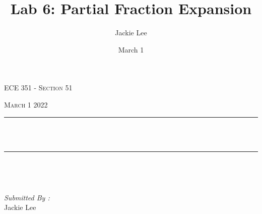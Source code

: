 \documentclass[12pt]{report}
\title{Lab 6: Partial Fraction Expansion}
\author{ Jackie Lee}
\date{March 1}
\makeatletter
\let\thetitle\@title
\makeatother
\begin{document}

\begin{titlepage}
	\centering
    \vspace*{0.5 cm}
\begin{center}    \textsc{\Large   ECE 351 - Section 51 }\\[2.0 cm]	\end{center}%
	\textsc{\Large March 1 2022  }\\[0.5 cm]				%
	\rule{\linewidth}{0.2 mm} \\[0.4 cm]
	{ \huge \bfseries \thetitle}\\
	\rule{\linewidth}{0.2 mm} \\[1.5 cm]
	
	\begin{minipage}{0.4\textwidth}
		\begin{flushleft} \large
			\end{flushleft}
			\end{minipage}~
			\begin{minipage}{0.4\textwidth}
            
			\begin{flushright} \large
			\emph{Submitted By :} \\
			Jackie Lee  
		\end{flushright}
           
	\end{minipage}\\[2 cm]
	
    
    
    
    
	
\end{titlepage}


\tableofcontents
\pagebreak

\renewcommand{\thesection}{\arabic{section}}
\end{document}
